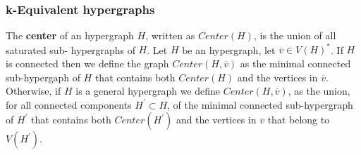 \documentclass[12pt,notitlepage,a4paper]{article}
\theoremstyle{definition}
\newcommand{\N}{\mathbb{N}}
\begin{document}
\subsubsection{k-Equivalent hypergraphs} \label{sect:equivunicycles}

The \textbf{center} of an hypergraph $H$, written as
$Center(H)$,  
is the union of all saturated sub- hypergraphs of $H$. 
Let $H$ be an hypergraph, let $\overline{v}\in V(H)^*$. 
If $H$
is connected then we define the graph
$Center(H,\overline{v})$
as the minimal connected sub-hypergaph of $H$ that contains
both $Center(H)$
and the vertices in $\overline{v}$. Otherwise,
if $H$ is a general hypergraph we define $Center(H,\overline{v})$,
as the union, for all connected components $H^\prime \subset H$,
of the minimal connected sub-hypergraph of $H^\prime$ that
contains both $Center(H^\prime)$
and the vertices in $\overline{v}$
that belong to $V(H^\prime)$.
\end{document}
